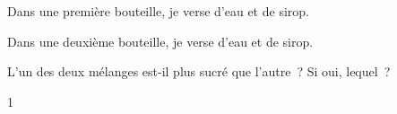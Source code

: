 \documentclass[a4paper,11pt]{report}
\begin{document}
\begin{exo}{
		Dans une première bouteille, je verse  d'eau et  de sirop.

		Dans une deuxième bouteille, je verse  d'eau et  de sirop.

L'un des deux mélanges est-il plus sucré que l'autre~? Si oui, lequel~?}{1}
\end{exo}









\end{document}

